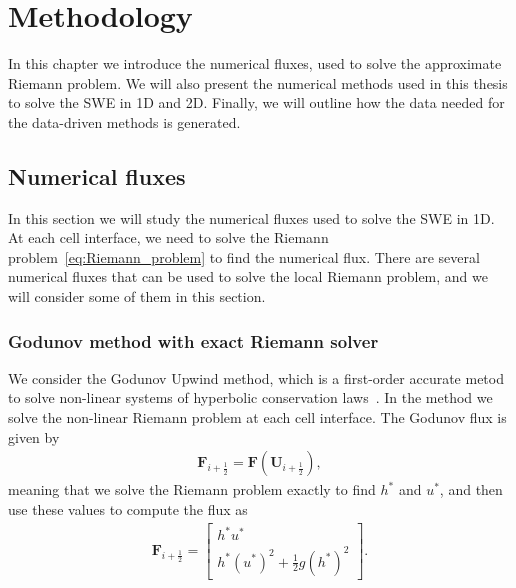 \chapter{Methodology}
In this chapter we introduce the numerical fluxes, used to solve the approximate Riemann problem.
We will also present the numerical methods used in this thesis to solve the SWE in 1D and 2D.
Finally, we will outline how the data needed for the data-driven methods is generated.

\section{Numerical fluxes}
In this section we will study the numerical fluxes used to solve the SWE in 1D.
At each cell interface, we need to solve the Riemann problem~\eqref{eq:Riemann_problem} to find the numerical flux.
There are several numerical fluxes that can be used to solve the local Riemann problem, and we will consider some of them in this section.

\subsection*{Godunov method with exact Riemann solver}
We consider the Godunov Upwind method, which is a first-order accurate metod to solve non-linear systems of hyperbolic conservation laws~\cite{Toro2024}.
In the method we solve the non-linear Riemann problem at each cell interface.
The Godunov flux is given by
\begin{align*}
    \mathbf{F}_{i + \frac{1}{2}} = \mathbf{F}(\mathbf{U}_{i + \frac{1}{2}}),
\end{align*}
meaning that we solve the Riemann problem exactly to find $h^*$ and $u^*$, and then use these values to compute the flux as 
\begin{align*}
    \mathbf{F}_{i + \frac{1}{2}} = \begin{bmatrix}
        h^* u^* \\ h^* {(u^{*})}^2 + \frac{1}{2} g {(h^{*})}^2
    \end{bmatrix}.
\end{align*}

